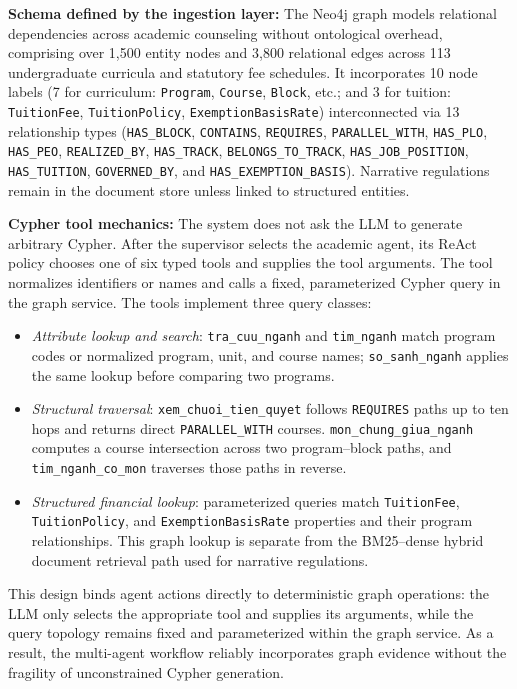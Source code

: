 \textbf{Schema defined by the ingestion layer:}
The Neo4j graph models relational dependencies across academic counseling without ontological overhead, comprising over 1,500 entity nodes and 3,800 relational edges across 113 undergraduate curricula and statutory fee schedules. It incorporates 10 node labels (7 for curriculum: \texttt{Program}, \texttt{Course}, \texttt{Block}, etc.; and 3 for tuition: \texttt{TuitionFee}, \texttt{TuitionPolicy}, \texttt{ExemptionBasisRate}) interconnected via 13 relationship types (\texttt{HAS\_BLOCK}, \texttt{CONTAINS}, \texttt{REQUIRES}, \texttt{PARALLEL\_WITH}, \texttt{HAS\_PLO}, \texttt{HAS\_PEO}, \texttt{REALIZED\_BY}, \texttt{HAS\_TRACK}, \texttt{BELONGS\_TO\_TRACK}, \texttt{HAS\_JOB\_POSITION}, \texttt{HAS\_TUITION}, \texttt{GOVERNED\_BY}, and \texttt{HAS\_EXEMPTION\_BASIS}). Narrative regulations remain in the document store unless linked to structured entities.

\textbf{Cypher tool mechanics:}
The system does not ask the LLM to generate arbitrary Cypher. After the supervisor selects the academic agent, its ReAct policy chooses one of six typed tools and supplies the tool arguments. The tool normalizes identifiers or names and calls a fixed, parameterized Cypher query in the graph service. The tools implement three query classes:
\begin{itemize}
    \item \emph{Attribute lookup and search}: \texttt{tra\_cuu\_nganh} and \texttt{tim\_nganh} match program codes or normalized program, unit, and course names; \texttt{so\_sanh\_nganh} applies the same lookup before comparing two programs.
    \item \emph{Structural traversal}: \texttt{xem\_chuoi\_tien\_quyet} follows \texttt{REQUIRES} paths up to ten hops and returns direct \texttt{PARALLEL\_WITH} courses. \texttt{mon\_chung\_giua\_nganh} computes a course intersection across two program--block paths, and \texttt{tim\_nganh\_co\_mon} traverses those paths in reverse.
    \item \emph{Structured financial lookup}: parameterized queries match \texttt{TuitionFee}, \texttt{TuitionPolicy}, and \texttt{ExemptionBasisRate} properties and their program relationships. This graph lookup is separate from the BM25--dense hybrid document retrieval path used for narrative regulations.
\end{itemize}
This design binds agent actions directly to deterministic graph operations: the LLM only selects the appropriate tool and supplies its arguments, while the query topology remains fixed and parameterized within the graph service. As a result, the multi-agent workflow reliably incorporates graph evidence without the fragility of unconstrained Cypher generation.

